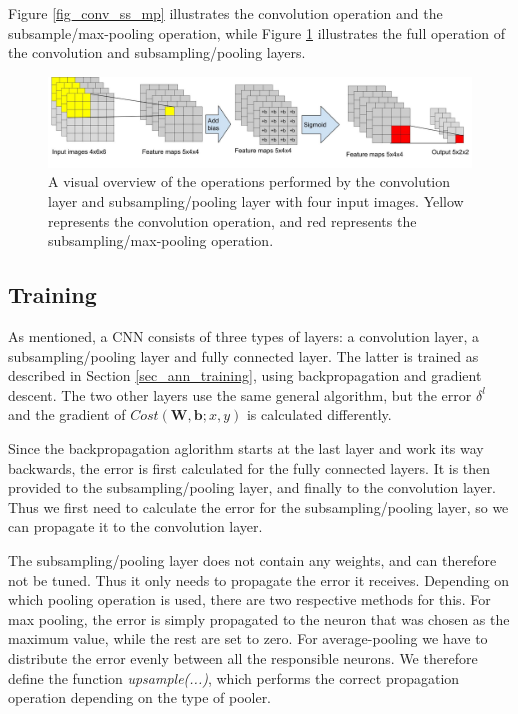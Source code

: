 Figure \ref{fig_conv_ss_mp} illustrates the convolution operation and the subsample/max-pooling operation, while Figure \ref{fig_visual_conv_ss_mp} illustrates the full operation of the convolution and subsampling/pooling layers. 

\begin{figure}[h!]
  \centering
      \includegraphics[width=1.3\textwidth]{Figures/Background/Convolution_subsample_pool}
  \caption[Convolutional layer operation]{A visual overview of the operations performed by the convolution layer and subsampling/pooling layer with four input images. Yellow represents the convolution operation, and red represents the subsampling/max-pooling operation.}
  \label{fig_visual_conv_ss_mp}
\end{figure}



\subsection{Training} \label{sec_cnn_training}
As mentioned, a CNN consists of three types of layers: a convolution layer, a subsampling/pooling layer and fully connected layer. The latter is trained as described in Section \ref{sec_ann_training}, using backpropagation and gradient descent. The two other layers use the same general algorithm, but the error $ \delta^l $ and the gradient of $ Cost(\mathbf{W,b}; x, y) $ is calculated differently. 

Since the backpropagation aglorithm starts at the last layer and work its way backwards, the error is first calculated for the fully connected layers. It is then provided to the subsampling/pooling layer, and finally to the convolution layer. Thus we first need to calculate the error for the subsampling/pooling layer, so we can propagate it to the convolution layer. 

The subsampling/pooling layer does not contain any weights, and can therefore not be tuned. Thus it only needs to propagate the error it receives. Depending on which pooling operation is used, there are two respective methods for this. For max pooling, the error is simply propagated to the neuron that was chosen as the maximum value, while the rest are set to zero. For average-pooling we have to distribute the error evenly between all the responsible neurons. We therefore define the function \textit{upsample(...)}, which performs the correct propagation operation depending on the type of pooler. 


